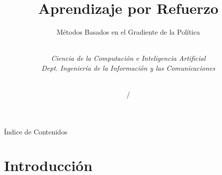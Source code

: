 \documentclass[10pt, envcountsect, handout, aspectratio=1610, hyperref={hypertexnames=true}]{beamer}
\title[Aprendizaje por Refuerzo]{Aprendizaje por Refuerzo}
\subtitle{Métodos Basados en el Gradiente de la Política} %
\author[L. D. Hernández] %
{%
	\sc{Luis Daniel Hernández Molinero }\\ %
	\textit{Ciencia de la Computación e Inteligencia Artificial}\\  %
	\textit{Dept. Ingeniería de la Información y las Comunicaciones}\\  %
	\\   %
}
\institute[DIIC]%
{
	\textit{Universidad de Murcia}
}
\date{\arabic{lastyear} / \the\year} %
\begin{document}
	






\begin{frame}[plain]
	\titlepage
\end{frame}


\begin{frame}{Índice de Contenidos}
	\tableofcontents 
	
\note{

}

\end{frame}







\section{Introducción}
\end{document}
